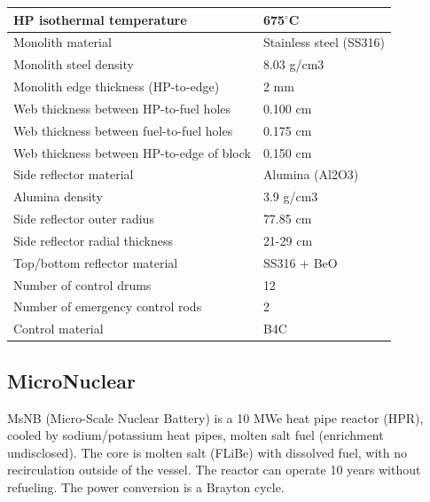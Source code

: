 \begin{table} [hbtp]
\begin{center}
\begin{tabular}{l     l}
HP isothermal temperature&675$^\circ{}$C        \\
\hline 
Monolith material&Stainless steel (SS316)       \\
Monolith steel density&8.03 g/cm3                         \\
Monolith edge thickness (HP-to-edge)&2 mm                                 \\
Web thickness between HP-to-fuel holes&0.100 cm                            \\
Web thickness between fuel-to-fuel holes&0.175 cm                            \\
Web thickness between HP-to-edge of block&0.150 cm                            \\
\hline 
Side reflector material&Alumina (Al2O3)       \\
Alumina density&3.9 g/cm3                        \\
Side reflector outer radius&77.85 cm                                 \\
Side reflector radial thickness&21-29 cm                            \\
Top/bottom reflector material&SS316 + BeO                            \\
\hline 
Number of control drums&12       \\
Number of emergency control rods&2       \\
Control material&B4C                        \\
\hline 

\end{tabular}
\end{center}
\end{table}

\pagebreak
\subsection{MicroNuclear}
MsNB  (Micro-Scale  Nuclear  Battery)  is  a  10  MWe  heat  pipe  reactor  (HPR),  cooled  by sodium/potassium heat pipes, molten salt fuel (enrichment undisclosed). The core is molten salt (FLiBe) with dissolved fuel,  with  no  recirculation  outside  of  the  vessel.  The  reactor  can  operate  10  years  without  refueling.  The  power conversion is a Brayton cycle.

